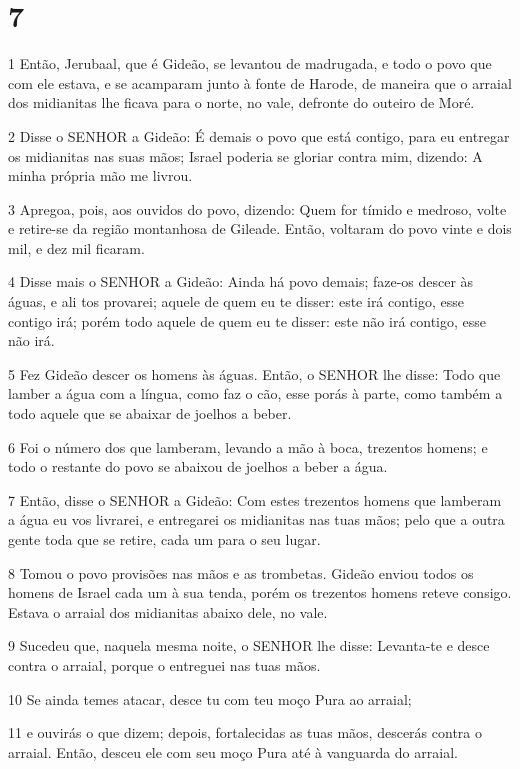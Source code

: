 \chapter{7}

\par 1 Então, Jerubaal, que é Gideão, se levantou de madrugada, e todo o povo que com ele estava, e se acamparam junto à fonte de Harode, de maneira que o arraial dos midianitas lhe ficava para o norte, no vale, defronte do outeiro de Moré.
\par 2 Disse o SENHOR a Gideão: É demais o povo que está contigo, para eu entregar os midianitas nas suas mãos; Israel poderia se gloriar contra mim, dizendo: A minha própria mão me livrou.
\par 3 Apregoa, pois, aos ouvidos do povo, dizendo: Quem for tímido e medroso, volte e retire-se da região montanhosa de Gileade. Então, voltaram do povo vinte e dois mil, e dez mil ficaram.
\par 4 Disse mais o SENHOR a Gideão: Ainda há povo demais; faze-os descer às águas, e ali tos provarei; aquele de quem eu te disser: este irá contigo, esse contigo irá; porém todo aquele de quem eu te disser: este não irá contigo, esse não irá.
\par 5 Fez Gideão descer os homens às águas. Então, o SENHOR lhe disse: Todo que lamber a água com a língua, como faz o cão, esse porás à parte, como também a todo aquele que se abaixar de joelhos a beber.
\par 6 Foi o número dos que lamberam, levando a mão à boca, trezentos homens; e todo o restante do povo se abaixou de joelhos a beber a água.
\par 7 Então, disse o SENHOR a Gideão: Com estes trezentos homens que lamberam a água eu vos livrarei, e entregarei os midianitas nas tuas mãos; pelo que a outra gente toda que se retire, cada um para o seu lugar.
\par 8 Tomou o povo provisões nas mãos e as trombetas. Gideão enviou todos os homens de Israel cada um à sua tenda, porém os trezentos homens reteve consigo. Estava o arraial dos midianitas abaixo dele, no vale.
\par 9 Sucedeu que, naquela mesma noite, o SENHOR lhe disse: Levanta-te e desce contra o arraial, porque o entreguei nas tuas mãos.
\par 10 Se ainda temes atacar, desce tu com teu moço Pura ao arraial;
\par 11 e ouvirás o que dizem; depois, fortalecidas as tuas mãos, descerás contra o arraial. Então, desceu ele com seu moço Pura até à vanguarda do arraial.
